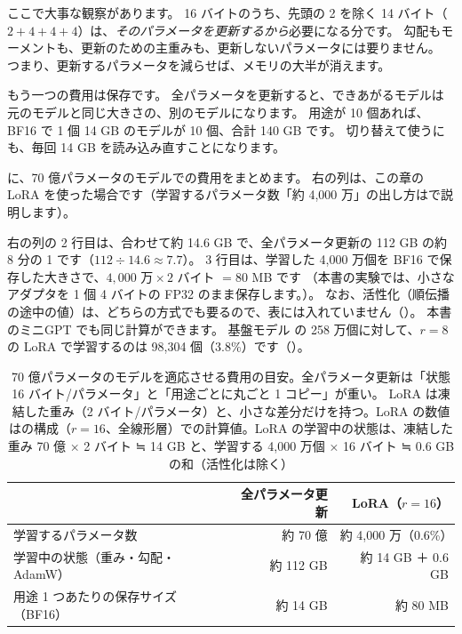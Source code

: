 ここで大事な観察があります。
16 バイトのうち、先頭の 2 を除く 14 バイト（$2+4+4+4$）は、\emph{そのパラメータを更新するから}必要になる分です。
勾配もモーメントも、更新のための主重みも、更新しないパラメータには要りません。
つまり、更新するパラメータを減らせば、メモリの大半が消えます。

もう一つの費用は保存です。
全パラメータを更新すると、できあがるモデルは元のモデルと同じ大きさの、別のモデルになります。
用途が 10 個あれば、BF16 で 1 個 14 GB のモデルが 10 個、合計 140 GB です。
切り替えて使うにも、毎回 14 GB を読み込み直すことになります。

に、70 億パラメータのモデルでの費用をまとめます。
右の列は、この章の LoRA を使った場合です（学習するパラメータ数「約 4,000 万」の出し方はで説明します）。

右の列の 2 行目は、合わせて約 14.6 GB で、全パラメータ更新の 112 GB の約 8 分の 1 です（$112\div14.6\approx7.7$）。
3 行目は、学習した 4,000 万個を BF16 で保存した大きさで、$4{,}000\text{ 万}\times2$ バイト $=80$ MB です
（本書の実験では、小さなアダプタを 1 個 4 バイトの FP32 のまま保存します。）。
なお、活性化（順伝播の途中の値）は、どちらの方式でも要るので、表には入れていません（）。
本書のミニGPT でも同じ計算ができます。
基盤モデル  の 258 万個に対して、$r=8$ の LoRA で学習するのは 98,304 個（3.8\%）です（）。

\begin{table}[tbp]
\centering
\caption{70 億パラメータのモデルを適応させる費用の目安。全パラメータ更新は「状態 16 バイト/パラメータ」と「用途ごとに丸ごと 1 コピー」が重い。
LoRA は凍結した重み（2 バイト/パラメータ）と、小さな差分だけを持つ。LoRA の数値はの構成（$r=16$、全線形層）での計算値。LoRA の学習中の状態は、凍結した重み 70 億 × 2 バイト ≒ 14 GB と、学習する 4,000 万個 × 16 バイト ≒ 0.6 GB の和（活性化は除く）}
\label{tab:lora-cost}
\small
\begin{tabular}{lrr}
\toprule
 & 全パラメータ更新 & LoRA（$r=16$） \\
\midrule
学習するパラメータ数 & 約 70 億 & 約 4,000 万（0.6\%） \\
学習中の状態（重み・勾配・AdamW） & 約 112 GB & 約 14 GB ＋ 0.6 GB \\
用途 1 つあたりの保存サイズ（BF16） & 約 14 GB & 約 80 MB \\
\bottomrule
\end{tabular}
\end{table}

